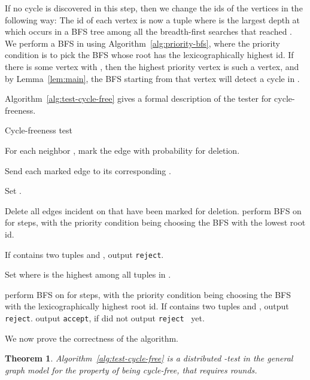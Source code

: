 \documentclass[11pt]{article}
\newtheorem{theorem}{Theorem}[section]
\newcommand{\accept}{\texttt{accept}}
\newcommand{\reject}{\texttt{reject}}
\begin{document}
If no cycle is discovered in this step, then we change the ids of the vertices in the following way:
The id of each vertex  is now a tuple  where  is the largest depth at which  occurs
in a BFS tree among all the breadth-first searches that reached .  We perform a BFS in  using
Algorithm~\ref{alg:priority-bfs}, where the priority condition is to pick the BFS whose root has the
lexicographically highest id. If there is some vertex with , then the
highest priority vertex is such a vertex, and by Lemma~\ref{lem:main}, the BFS starting from that
vertex will detect a cycle in .

Algorithm~\ref{alg:test-cycle-free} gives a formal description of the tester for cycle-freeness.

\begin{algorithm}[htbp]
  \caption{Cycle-freeness test\label{alg:test-cycle-free}}
  {
    For each neighbor , mark the edge  with probability  for deletion.

    Send each marked edge  to its corresponding .

    Set .
  }
  {
    Delete all edges incident on  that have been marked for deletion.
  }
  {
    perform BFS on  for  steps, with the priority condition being choosing the
    BFS with the lowest root id.
  }
  {
    If  contains two tuples  and , output \reject.

    Set  where  is the highest among all tuples  in
    .
    \label{step:set-id}
  }
  {
    perform BFS on  for  steps, with the priority condition being choosing the BFS
    with the lexicographically highest root id.
  }
  {
    If  contains two tuples  and , output \reject.
  }
  {
    output \accept, if  did not output \reject~ yet.
  }
\end{algorithm}

We now prove the correctness of the algorithm.


\begin{theorem}
Algorithm~\ref{alg:test-cycle-free} is a distributed -test in the general graph model
for the property of being cycle-free, that requires  rounds.
\label{thm:cycle-free-correctness}
\end{theorem}
\end{document}
